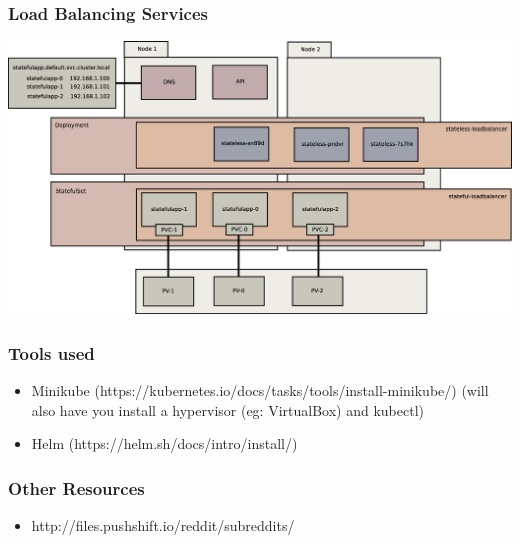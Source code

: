 \documentclass{beamer}
\begin{document}
\begin{frame}
    \frametitle{Load Balancing Services}
    \includegraphics[width=\textwidth,height=\textheight,keepaspectratio]{graphics/08-loadBalancer.eps}
\end{frame}

\begin{frame}
\frametitle{Tools used}
\begin{itemize}
    \item Minikube (https://kubernetes.io/docs/tasks/tools/install-minikube/)
(will also have you install a hypervisor (eg: VirtualBox) and kubectl)
    \item Helm (https://helm.sh/docs/intro/install/)
\end{itemize}
\end{frame}

\begin{frame}
\frametitle{Other Resources}
\begin{itemize}
    \item http://files.pushshift.io/reddit/subreddits/
\end{itemize}
\end{frame}
\end{document}

